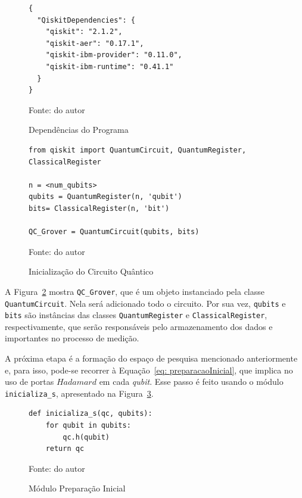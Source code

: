 \begin{figure}[!htb]
\centering
\caption{Dependências do Programa   } 
\begin{verbatim}
{
  "QiskitDependencies": {
    "qiskit": "2.1.2",
    "qiskit-aer": "0.17.1",
    "qiskit-ibm-provider": "0.11.0",
    "qiskit-ibm-runtime": "0.41.1"
  }
}
\end{verbatim} 
{\small Fonte: do autor} 
\label{cod: dependencias} 
\end{figure}

\begin{figure}[!htb]
\centering
\caption{Inicialização do Circuito Qu\^{a}ntico} 
\begin{verbatim}
from qiskit import QuantumCircuit, QuantumRegister, ClassicalRegister

n = <num_qubits>
qubits = QuantumRegister(n, 'qubit')
bits= ClassicalRegister(n, 'bit')

QC_Grover = QuantumCircuit(qubits, bits)
\end{verbatim} 
{\small Fonte: do autor} 
\label{cod: inicializacao} 
\end{figure}

A Figura~\ref{cod: inicializacao} mostra \verb|QC_Grover|, que é um objeto instanciado pela classe \verb|QuantumCircuit|. Nela será adicionado todo o circuito. Por sua vez, \verb|qubits| e \verb|bits| são instâncias das classes \verb|QuantumRegister| e \verb|ClassicalRegister|, respectivamente, que serão responsáveis pelo armazenamento dos dados e importantes no processo de medição.

A próxima etapa é a formação do espaço de pesquisa mencionado anteriormente e, para isso, pode-se recorrer à Equação~\ref{eq: preparacaoInicial}, que implica no uso de portas $Hadamard$ em cada \emph{qubit}. Esse passo é feito usando o módulo \verb|inicializa_s|, apresentado na Figura~\ref{cod: preparacao}.

\begin{figure}[!htb]
\centering
\caption{Módulo Preparação Inicial} 
\begin{verbatim}
def inicializa_s(qc, qubits):
    for qubit in qubits:
        qc.h(qubit)
    return qc
\end{verbatim} 
{\small Fonte: do autor} 
\label{cod: preparacao} 
\end{figure}

